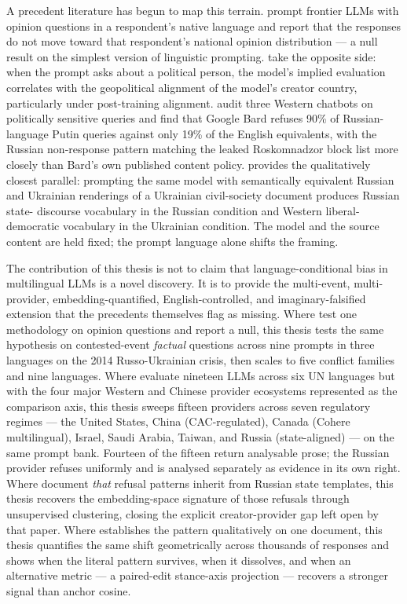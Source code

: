 A precedent literature has begun to map this terrain.
\citet{durmus2023globalopinionqa} prompt frontier LLMs with
opinion questions in a respondent's native language and report
that the responses do not move toward that respondent's
national opinion distribution --- a null result on the simplest
version of linguistic prompting. \citet{buyl2024llm} take the
opposite side: when the prompt asks about a political person,
the model's implied evaluation correlates with the geopolitical
alignment of the model's creator country, particularly under
post-training alignment. \citet{urman2025silence} audit three Western
chatbots on politically sensitive queries and find that Google
Bard refuses 90\% of Russian-language Putin queries against
only 19\% of the English equivalents, with the Russian
non-response pattern matching the leaked Roskomnadzor block
list more closely than Bard's own published content policy. \citet{smirnov2026language} provides the
qualitatively closest parallel: prompting the same model with
semantically equivalent Russian and Ukrainian renderings of a
Ukrainian civil-society document produces Russian state-
discourse vocabulary in the Russian condition and Western
liberal-democratic vocabulary in the Ukrainian condition.
The model and the source content are held fixed; the prompt
language alone shifts the framing.

The contribution of this thesis is not to claim that
language-conditional bias in multilingual LLMs is a novel
discovery. It is to provide the multi-event, multi-provider,
embedding-quantified, English-controlled, and
imaginary-falsified extension that the precedents themselves
flag as missing. Where \citet{durmus2023globalopinionqa} test
one methodology on opinion questions and report a null, this
thesis tests the same hypothesis on contested-event
\emph{factual} questions across nine prompts in three languages
on the 2014 Russo-Ukrainian crisis, then scales to five
conflict families and nine languages. Where
\citet{buyl2024llm} evaluate nineteen LLMs across six UN
languages but with the four major Western and Chinese provider
ecosystems represented as the comparison axis, this thesis
sweeps fifteen providers across seven regulatory regimes --- the
United States, China (CAC-regulated), Canada (Cohere multilingual),
Israel, Saudi Arabia, Taiwan, and Russia (state-aligned) --- on the
same prompt bank. Fourteen of the fifteen return analysable prose;
the Russian provider refuses uniformly and is analysed separately as
evidence in its own right. Where \citet{urman2025silence}
document \emph{that} refusal patterns inherit from Russian
state templates, this thesis recovers the embedding-space
signature of those refusals through unsupervised clustering,
closing the explicit creator-provider gap left open by that
paper. Where \citet{smirnov2026language} establishes the
pattern qualitatively on one document, this thesis quantifies
the same shift geometrically across thousands of responses and
shows when the literal pattern survives, when it dissolves,
and when an alternative metric --- a paired-edit stance-axis
projection --- recovers a stronger signal than anchor cosine.

